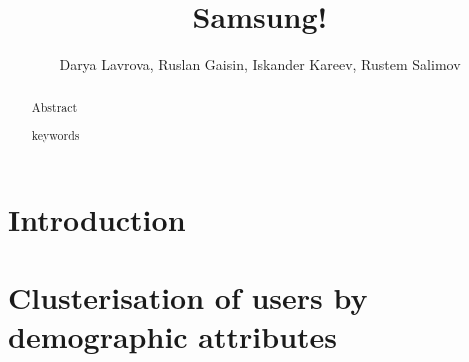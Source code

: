 \documentclass[runningheads,a4paper]{llncs}
\newcommand{\keywords}[1]{\par\addvspace\baselineskip
\noindent\keywordname\enspace\ignorespaces#1}
\begin{document}
\mainmatter  %

\title{Samsung!}




\author{Darya Lavrova, Ruslan Gaisin, Iskander Kareev, Rustem Salimov}
%


%
%

\maketitle


\begin{abstract}
Abstract
\keywords{keywords}
\end{abstract}


\section{Introduction}



\section{Clusterisation of users by demographic attributes}
\end{document}
